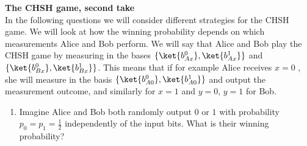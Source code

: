 \begin{exercises}
\item {\bf The CHSH game, second take} \\
In the following questions we will consider different strategies for the CHSH game. We will look at how the winning probability depends on which measurements Alice and Bob perform. We will say that Alice and Bob play the CHSH game by measuring in the bases $\{\ket{b^0_{Ax}},\ket{b^1_{Ax}}\}$ and $\{\ket{b^0_{Bx}},\ket{b^1_{Bx}}\}$. This means that if for example Alice receives $x=0$ , she will measure in the basis $\{\ket{b^0_{A0}},\ket{b^1_{A0}}\}$ and output the measurement outcome, and similarly for $x=1$ and $y=0$, $y=1$ for Bob.
\begin{enumerate}
 \item Imagine Alice and Bob both randomly output $0$ or $1$ with probability $p_0 = p_1 = \frac{1}{2}$ independently of the input bits. What is their winning probability?


\end{enumerate}
\end{exercises}
